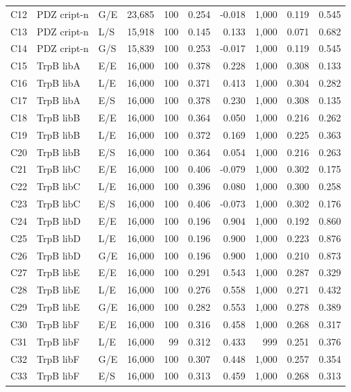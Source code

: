 \begin{longtable}[c]{lllrrrrrrr}
C12 & PDZ cript-n & G/E & 23,685 & 100 & 0.254 & -0.018 & 1,000 & 0.119 & 0.545 \\
C13 & PDZ cript-n & L/S & 15,918 & 100 & 0.145 & 0.133 & 1,000 & 0.071 & 0.682 \\
C14 & PDZ cript-n & G/S & 15,839 & 100 & 0.253 & -0.017 & 1,000 & 0.119 & 0.545 \\
C15 & TrpB libA & E/E & 16,000 & 100 & 0.378 & 0.228 & 1,000 & 0.308 & 0.133 \\
C16 & TrpB libA & L/E & 16,000 & 100 & 0.371 & 0.413 & 1,000 & 0.304 & 0.282 \\
C17 & TrpB libA & E/S & 16,000 & 100 & 0.378 & 0.230 & 1,000 & 0.308 & 0.135 \\
C18 & TrpB libB & E/E & 16,000 & 100 & 0.364 & 0.050 & 1,000 & 0.216 & 0.262 \\
C19 & TrpB libB & L/E & 16,000 & 100 & 0.372 & 0.169 & 1,000 & 0.225 & 0.363 \\
C20 & TrpB libB & E/S & 16,000 & 100 & 0.364 & 0.054 & 1,000 & 0.216 & 0.263 \\
C21 & TrpB libC & E/E & 16,000 & 100 & 0.406 & -0.079 & 1,000 & 0.302 & 0.175 \\
C22 & TrpB libC & L/E & 16,000 & 100 & 0.396 & 0.080 & 1,000 & 0.300 & 0.258 \\
C23 & TrpB libC & E/S & 16,000 & 100 & 0.406 & -0.073 & 1,000 & 0.302 & 0.176 \\
C24 & TrpB libD & E/E & 16,000 & 100 & 0.196 & 0.904 & 1,000 & 0.192 & 0.860 \\
C25 & TrpB libD & L/E & 16,000 & 100 & 0.196 & 0.900 & 1,000 & 0.223 & 0.876 \\
C26 & TrpB libD & G/E & 16,000 & 100 & 0.196 & 0.900 & 1,000 & 0.210 & 0.873 \\
C27 & TrpB libE & E/E & 16,000 & 100 & 0.291 & 0.543 & 1,000 & 0.287 & 0.329 \\
C28 & TrpB libE & L/E & 16,000 & 100 & 0.276 & 0.558 & 1,000 & 0.271 & 0.432 \\
C29 & TrpB libE & G/E & 16,000 & 100 & 0.282 & 0.553 & 1,000 & 0.278 & 0.389 \\
C30 & TrpB libF & E/E & 16,000 & 100 & 0.316 & 0.458 & 1,000 & 0.268 & 0.317 \\
C31 & TrpB libF & L/E & 16,000 & 99 & 0.312 & 0.433 & 999 & 0.251 & 0.376 \\
C32 & TrpB libF & G/E & 16,000 & 100 & 0.307 & 0.448 & 1,000 & 0.257 & 0.354 \\
C33 & TrpB libF & E/S & 16,000 & 100 & 0.313 & 0.459 & 1,000 & 0.268 & 0.313 \\

\end{longtable}
